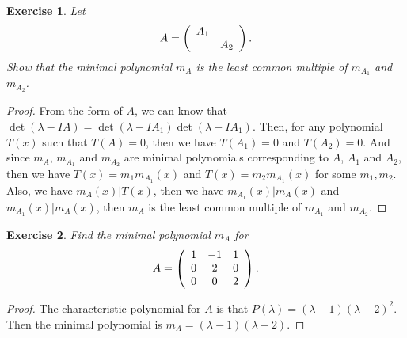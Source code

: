 \documentclass[11pt]{book}
\newtheorem{exercise}{Exercise}[section]
\theoremstyle{definition}
\numberwithin{equation}{subsection}
\begin{document}
\medskip

\begin{exercise}
Let
\begin{align*}
  A=\left(
    \begin{array}
    [c]{cc}%
    A_{1} & \\
    & A_{2}%
    \end{array}
    \right).  
\end{align*}
Show that the minimal polynomial $m_{A}$ is the least common multiple of
$m_{A_{1}}$ and $m_{A_{2}}$.
\end{exercise}
\begin{proof}
From the form of $A$, we can know that $\det(\lambda-IA)=\det(\lambda-IA_1)\det(\lambda-IA_1)$. Then, for any polynomial $T(x)$ such that $T(A)=0$, then we have $T(A_1)=0$ and $T(A_2)=0$. And since $m_A$, $m_{A_1}$ and $m_{A_2}$ are minimal polynomials corresponding to $A$, $A_1$ and $A_2$, then we have $T(x)=m_1 m_{A_1}(x)$ and $T(x)=m_2 m_{A_1}(x)$ for some $m_1, m_2$. Also, we have $m_A(x)|T(x)$, then we have $m_{A_1}(x)|m_A(x)$ and $m_{A_1}(x)|m_A(x)$, then $m_A$ is the least common multiple of $m_{A_{1}}$ and $m_{A_{2}}$.
\end{proof}

\medskip

\begin{exercise}
Find the minimal polynomial $m_{A}$ for%
$$
A=\left(
\begin{array}
[c]{ccc}%
1 & -1 & 1\\
0 & 2 & 0\\
0 & 0 & 2
\end{array}
\right)  .
$$
\end{exercise}
\begin{proof}
The characteristic polynomial for $A$ is that $P(\lambda)=(\lambda-1)(\lambda-2)^2$. Then the minimal polynomial is $m_A=(\lambda-1)(\lambda-2)$.
\end{proof}

\medskip
\end{document}
